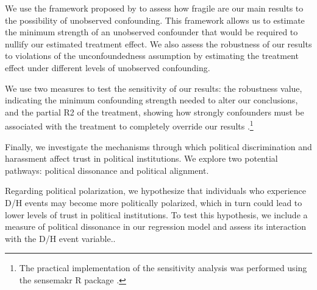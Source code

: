 \documentclass{article}
\begin{document}
We use the framework proposed by \textcite{cinelli_making_2020} to assess how fragile are our main results to the possibility of unobserved confounding. This framework allows us to estimate the minimum strength of an unobserved confounder that would be required to nullify our estimated treatment effect. We also assess the robustness of our results to violations of the unconfoundedness assumption by estimating the treatment effect under different levels of unobserved confounding.

We use two measures to test the sensitivity of our results: the robustness value, indicating the minimum confounding strength needed to alter our conclusions, and the partial R2 of the treatment, showing how strongly confounders must be associated with the treatment to completely override our results \parencite{cinelli_making_2020}.\footnote{The practical implementation of the sensitivity analysis was performed using the sensemakr R package \parencite{cinelli_sensemakr_2024}.}

Finally, we investigate the mechanisms through which political discrimination and harassment affect trust in political institutions. We explore two potential pathways: political dissonance and political alignment.

Regarding political polarization, we hypothesize that individuals who experience D/H events may become more politically polarized, which in turn could lead to lower levels of trust in political institutions. To test this hypothesis, we include a measure of political dissonance in our regression model and assess its interaction with the D/H event variable..


\end{document}
